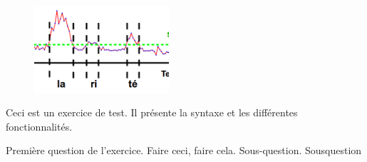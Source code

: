 

\begin{figure}
    \centering
    \includegraphics[width=5cm]{images/1.png}
\end{figure}

Ceci est un exercice de test. Il présente la syntaxe et les différentes fonctionnalités.

\question Première question de l'exercice. Faire ceci, faire cela.
\subquestion Sous-question.
\question \subquestion Sousquestion

